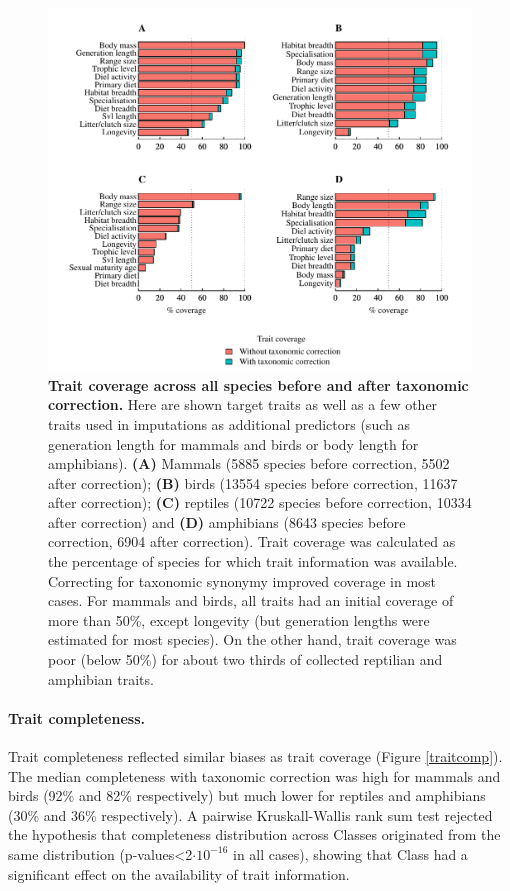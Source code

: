 \begin{figure}[h!]
\centering
\includegraphics[scale=0.85]{figures/chapter2/Trait_coverage/Predictor_traits/All_species}
\caption[Trait coverage across all species before and after taxonomic correction]{\textbf{Trait coverage across all species before and after taxonomic correction.} Here are shown target traits as well as a few other traits used in imputations as additional predictors (such as generation length for mammals and birds or body length for amphibians). \textbf{(A)} Mammals (5885 species before correction, 5502 after correction); \textbf{(B)} birds (13554 species before correction, 11637 after correction); \textbf{(C)} reptiles (10722 species before correction, 10334 after correction) and \textbf{(D)}  amphibians (8643 species before correction, 6904 after correction). Trait coverage was calculated as the percentage of species for which trait information was available. Correcting for taxonomic synonymy improved coverage in most cases. For mammals and birds, all traits had an initial coverage of more than 50\%, except longevity (but generation lengths were estimated for most species). On the other hand, trait coverage was poor (below 50\%) for about two thirds of collected reptilian and amphibian traits.}
\label{traitcov}
\end{figure}

\paragraph{Trait completeness.}
 Trait completeness reflected similar biases as trait coverage (Figure \ref{traitcomp}). The median completeness with taxonomic correction was high for mammals and birds (92\% and 82\% respectively) but much lower for reptiles and amphibians (30\% and 36\% respectively). A pairwise Kruskall-Wallis rank sum test rejected the hypothesis that completeness distribution across Classes originated from the same distribution (p-values<2$\cdot10^{-16}$ in all cases), showing that Class had a significant effect on the availability of trait information. 

